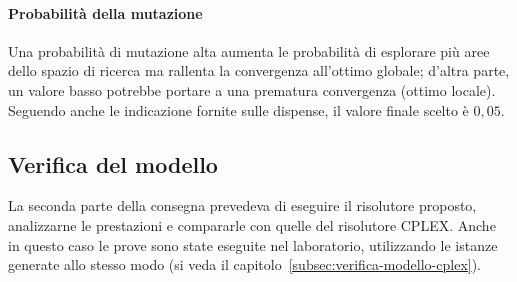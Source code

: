 \paragraph{Probabilità della mutazione}
Una probabilità di mutazione alta aumenta le probabilità di esplorare più aree dello spazio di ricerca
ma rallenta la convergenza all'ottimo globale; d'altra parte, un valore basso potrebbe portare a una prematura convergenza (ottimo locale).
Seguendo anche le indicazione fornite sulle dispense, il valore finale scelto è $0,05$.
\subsection{Verifica del modello}\label{subsec:risultati-ga}
La seconda parte della consegna prevedeva di eseguire il risolutore proposto, analizzarne le prestazioni
e compararle con quelle del risolutore CPLEX.
Anche in questo caso le prove sono state eseguite nel laboratorio, utilizzando le istanze generate
allo stesso modo (si veda il capitolo~\ref{subsec:verifica-modello-cplex}).

